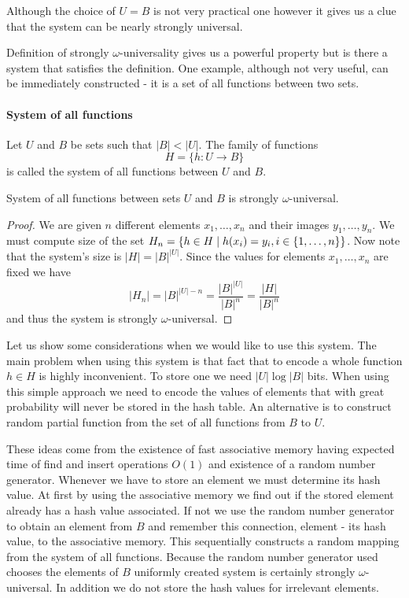 Although the choice of $U = B$ is not very practical one however it gives us a clue that the system can be nearly strongly universal.

Definition of strongly $\omega$-universality gives us a powerful property but is there a system that satisfies the definition. One example, although not very useful, can be immediately constructed - it is a set of all functions between two sets.

\paragraph{System of all functions}
\begin{definition}
Let $U$ and $B$ be sets such that $|B| < |U|$. The family of functions
\[
H = \{h: U \rightarrow B \}
\]
is called the system of all functions between $U$ and $B$.
\end{definition}

\begin{remark}
System of all functions between sets $U$ and $B$ is strongly $\omega$-universal.
\end{remark}
\begin{proof}
We are given $n$ different elements $x_1, \dots, x_n$ and their images $y_1, \dots, y_n$. We must compute size of the set $H_n = \lbrace h \in H \mid h(x_i) = y_i, i \in \lbrace 1, \dots, n\rbrace \rbrace$. Now note that the system's size is $|H| = {|B|}^{|U|}$. Since the values for elements $x_1, \dots, x_n$ are fixed we have \[ |H_n| = {|B|}^{|U| - n} = \frac{{|B|}^{|U|}}{{|B|}^{n}} = \frac{|H|}{|B|^n} \] and thus the system is strongly $\omega$-universal.
\end{proof}

Let us show some considerations when we would like to use this system. The main problem when using this system is that fact that to encode a whole function $h \in H$ is highly inconvenient. To store one we need $|U| \log |B|$ bits. When using this simple approach we need to encode the values of elements that with great probability will never be stored in the hash table. An alternative is to construct random partial function from the set of all functions from $B$ to $U$. 

These ideas come from the existence of fast associative memory having expected time of find and insert operations $O(1)$ and existence of a random number generator. Whenever we have to store an element we must determine its hash value. At first by using the associative memory we find out if the stored element already has a hash value associated. If not we use the random number generator to obtain an element from $B$ and remember this connection, element - its hash value, to the associative memory. This sequentially constructs a random mapping from the system of all functions. Because the random number generator used chooses the elements of $B$ uniformly created system is certainly strongly $\omega$-universal. In addition we do not store the hash values for irrelevant elements. 

